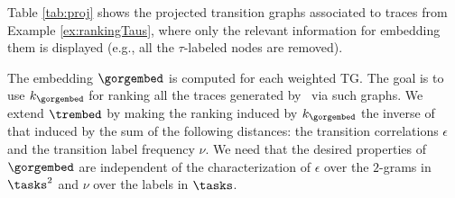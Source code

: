 \begin{example}\label{ex:neue}
	Table \ref{tab:proj} shows the projected transition graphs associated to  traces from Example \ref{ex:rankingTaus}, where only the relevant information
	for embedding them is displayed (e.g., all the $\tau$-labeled nodes are removed).
\end{example}
%	
The embedding $\gorgembed$ is computed for each weighted TG. The goal is to use
$k_{\gorgembed}$ for ranking all the traces generated by \unravelling\ via such graphs. We extend $\trembed$ %
by making the ranking induced by $k_{\gorgembed}$ the inverse of 
that induced by the
sum of the following distances: the transition correlations $\epsilon$ and the transition label frequency $\nu$.
We need that the desired properties of $\gorgembed$ are independent of the characterization of $\epsilon$ over the 
$2$-grams in $\tasks^2$ and $\nu$ over the labels in $\tasks$. %


